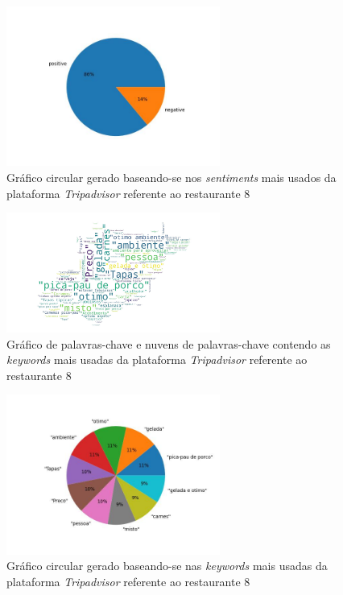 \begin{figure}[!htb]
\centering
\includegraphics[width=7cm]{figuras/TripAdvisor/Restaurants/restaurant8_sentiments.jpeg}
\caption{Gráfico circular gerado baseando-se nos \textit{sentiments} mais usados da plataforma \textit{Tripadvisor} referente ao restaurante 8}
\label{fig:exemplofig}
\end{figure}

\begin{figure}[!htb]
\centering
\includegraphics[width=7cm]{figuras/TripAdvisor/Restaurants/restaurant8_keywordcloud.jpeg}
\caption{Gráfico de palavras-chave e nuvens de palavras-chave contendo as \textit{keywords} mais usadas da plataforma \textit{Tripadvisor} referente ao restaurante 8}
\label{fig:exemplofig}
\end{figure}

\begin{figure}[!htb]
\centering
\includegraphics[width=7cm]{figuras/TripAdvisor/Restaurants/restaurant8_keywords.jpeg}
\caption{Gráfico circular gerado baseando-se nas \textit{keywords} mais usadas da plataforma \textit{Tripadvisor} referente ao restaurante 8}
\label{fig:exemplofig}
\end{figure}

